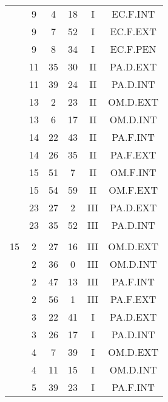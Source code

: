 \documentclass[12pt, a4paper]{article}
\begin{document}
\begin{multicols}{3}
{\begin{tabular}{c c c c c c}
	 	 	 	 & 9 & 4 & 18 & I & EC.F.INT\\%
	 	 	 	 & 9 & 7 & 52 & I & EC.F.EXT\\%
	 	 	 	 & 9 & 8 & 34 & I & EC.F.PEN\\%
	 	 	 	 & 11 & 35 & 30 & II & PA.D.EXT\\%
	 	 	 	 & 11 & 39 & 24 & II & PA.D.INT\\%
	 	 	 	 & 13 & 2 & 23 & II & OM.D.EXT\\%
	 	 	 	 & 13 & 6 & 17 & II & OM.D.INT\\%
	 	 	 	 & 14 & 22 & 43 & II & PA.F.INT\\%
	 	 	 	 & 14 & 26 & 35 & II & PA.F.EXT\\%
	 	 	 	 & 15 & 51 & 7 & II & OM.F.INT\\%
	 	 	 	 & 15 & 54 & 59 & II & OM.F.EXT\\%
	 	 	 	 & 23 & 27 & 2 & III & PA.D.EXT\\%
	 	 	 	 & 23 & 35 & 52 & III & PA.D.INT\\%
	 	 	 	 & & & & & \\%
	 	 	 	15 & 2 & 27 & 16 & III & OM.D.EXT\\%
	 	 	 	 & 2 & 36 & 0 & III & OM.D.INT\\%
	 	 	 	 & 2 & 47 & 13 & III & PA.F.INT\\%
	 	 	 	 & 2 & 56 & 1 & III & PA.F.EXT\\%
	 	 	 	 & 3 & 22 & 41 & I & PA.D.EXT\\%
	 	 	 	 & 3 & 26 & 17 & I & PA.D.INT\\%
	 	 	 	 & 4 & 7 & 39 & I & OM.D.EXT\\%
	 	 	 	 & 4 & 11 & 15 & I & OM.D.INT\\%
	 	 	 	 & 5 & 39 & 23 & I & PA.F.INT\\%

\end{tabular}}
\end{multicols}
\end{document}
